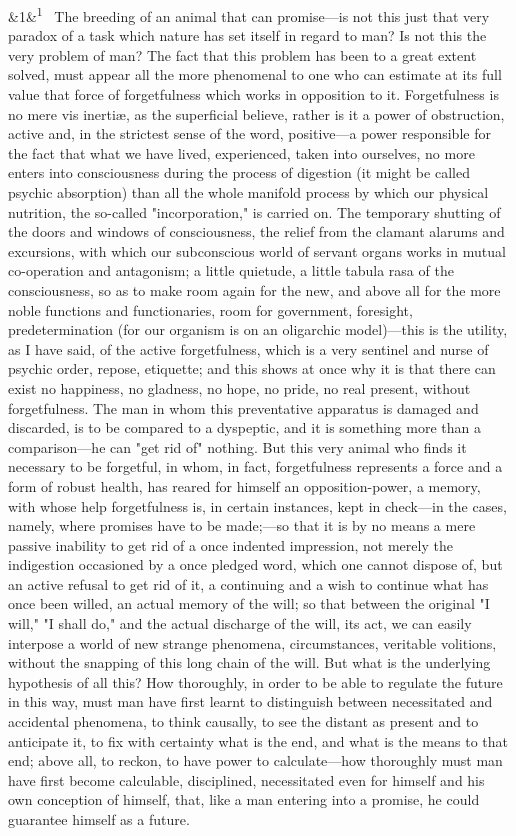 \documentclass[12pt]{article}
\newcommand{\para}[1][]{\par\noindent\ifx&#1&\else\textsuperscript{\footnotesize #1}~\fi}
\begin{document}
\para[1] The breeding of an animal that can promise---is not this just that very paradox of a task which nature has set itself in regard to man? Is not this the very problem of man? The fact that this problem has been to a great extent solved, must appear all the more phenomenal to one who can estimate at its full value that force of forgetfulness which works in opposition to it. Forgetfulness is no mere vis inertiæ, as the superficial believe, rather is it a power of obstruction, active and, in the strictest sense of the word, positive---a power responsible for the fact that what we have lived, experienced, taken into ourselves, no more enters into consciousness during the process of digestion (it might be called psychic absorption) than all the whole manifold process by which our physical nutrition, the so-called "incorporation," is carried on. The temporary shutting of the doors and windows of consciousness, the relief from the clamant alarums and excursions, with which our subconscious world of servant organs works in mutual co-operation and antagonism; a little quietude, a little tabula rasa of the consciousness, so as to make room again for the new, and above all for the more noble functions and functionaries, room for government, foresight, predetermination (for our organism is on an oligarchic model)---this is the utility, as I have said, of the active forgetfulness, which is a very sentinel and nurse of psychic order, repose, etiquette; and this shows at once why it is that there can exist no happiness, no gladness, no hope, no pride, no real present, without forgetfulness. The man in whom this preventative apparatus is damaged and discarded, is to be compared to a dyspeptic, and it is something more than a comparison---he can "get rid of" nothing. But this very animal who finds it necessary to be forgetful, in whom, in fact, forgetfulness represents a force and a form of robust health, has reared for himself an opposition-power, a memory, with whose help forgetfulness is, in certain instances, kept in check---in the cases, namely, where promises have to be made;---so that it is by no means a mere passive inability to get rid of a once indented impression, not merely the indigestion occasioned by a once pledged word, which one cannot dispose of, but an active refusal to get rid of it, a continuing and a wish to continue what has once been willed, an actual memory of the will; so that between the original "I will," "I shall do," and the actual discharge of the will, its act, we can easily interpose a world of new strange phenomena, circumstances, veritable volitions, without the snapping of this long chain of the will. But what is the underlying hypothesis of all this? How thoroughly, in order to be able to regulate the future in this way, must man have first learnt to distinguish between necessitated and accidental phenomena, to think causally, to see the distant as present and to anticipate it, to fix with certainty what is the end, and what is the means to that end; above all, to reckon, to have power to calculate---how thoroughly must man have first become calculable, disciplined, necessitated even for himself and his own conception of himself, that, like a man entering into a promise, he could guarantee himself as a future.
\end{document}
